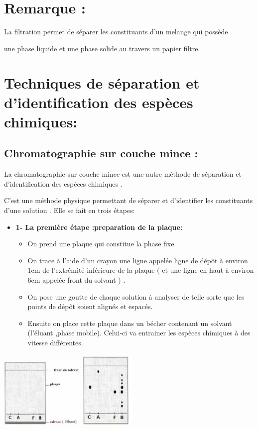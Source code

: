 \documentclass[12pt]{article}
\begin{document}
\section*{Remarque : }
La filtration permet de séparer
les constituants d'un melange qui possède


une phase liquide et une phase solide
au travers un papier filtre.


\section{Techniques de séparation et d'identification des espèces chimiques: }
\subsection{ Chromatographie sur couche mince : }
La chromatographie sur couche mince est une autre méthode de séparation et d'identification des espèces chimiques .

C'est une méthode physique permettant de séparer et d'identifier les constituants d'une solution . Elle se fait
en trois étapes: 

\begin{itemize}

	\item \textbf{1- La première étape :preparation de la plaque: }
		\begin{itemize}
			\item On prend une plaque qui constitue la phase fixe.
			\item On trace à l'aide d'un crayon une ligne appelée ligne de dépôt à environ 1cm de l'extrémité inférieure de la plaque
( et une ligne en haut à environ 6cm appelée front du solvant ) .


\item On pose une goutte de chaque solution à analyser de telle sorte que les points de dépôt soient alignés et espacés.

\item Ensuite on place cette plaque dans un bécher contenant un solvant (l'éluant ,phase mobile). Celui-ci va entrainer
les espèces chimiques à des vitesse différentes.
		\end{itemize}
\end{itemize}
\begin{center}
	\includegraphics[width=0.3\textwidth]{./img/Exrtaction_05.png}
	\includegraphics[width=0.2\textwidth]{./img/Extraction_06.png}
\end{center}
\end{document}
